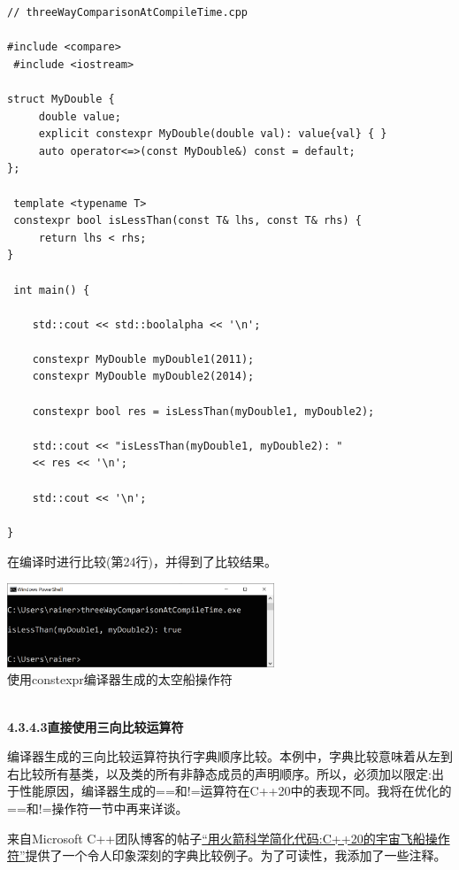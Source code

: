 \begin{lstlisting}[style=styleCXX]
// threeWayComparisonAtCompileTime.cpp

#include <compare>
 #include <iostream>

struct MyDouble {
	 double value;
	 explicit constexpr MyDouble(double val): value{val} { }
	 auto operator<=>(const MyDouble&) const = default;
};

 template <typename T>
 constexpr bool isLessThan(const T& lhs, const T& rhs) {
	 return lhs < rhs;
}

 int main() {
	
	std::cout << std::boolalpha << '\n';
	
	constexpr MyDouble myDouble1(2011);
	constexpr MyDouble myDouble2(2014);
	
	constexpr bool res = isLessThan(myDouble1, myDouble2);
	
	std::cout << "isLessThan(myDouble1, myDouble2): "
	<< res << '\n';
	
	std::cout << '\n';

}
\end{lstlisting}

在编译时进行比较(第24行)，并得到了比较结果。

\begin{center}
\includegraphics[width=0.6\textwidth]{content/3/chapter4/images/30.png}\\
使用constexpr编译器生成的太空船操作符
\end{center}

\hspace*{\fill} \\ %
\noindent
\textbf{4.3.4.3\hspace{0.2cm}直接使用三向比较运算符}

编译器生成的三向比较运算符执行字典顺序比较。本例中，字典比较意味着从左到右比较所有基类，以及类的所有非静态成员的声明顺序。所以，必须加以限定:出于性能原因，编译器生成的==和!=运算符在C++20中的表现不同。我将在优化的==和!=操作符一节中再来详谈。

来自Microsoft C++团队博客的帖子\href{https://devblogs.microsoft.com/cppblog/simplify-your-code-with-rocket-science-c20s-spaceship-operator/}{“用火箭科学简化代码:C++20的宇宙飞船操作符”}提供了一个令人印象深刻的字典比较例子。为了可读性，我添加了一些注释。

